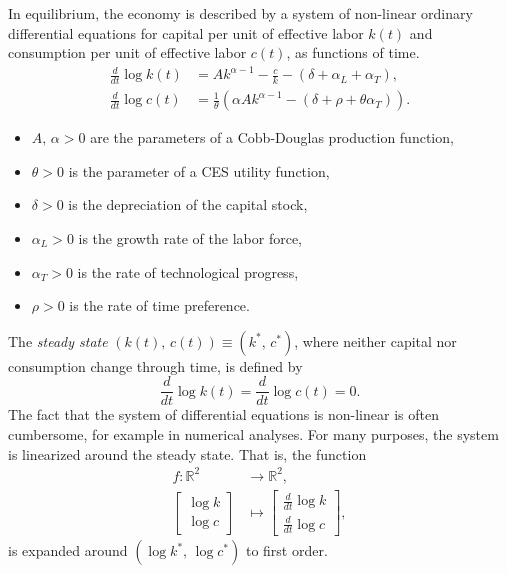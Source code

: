 \documentclass[10pt]{article}
\newcommand{\R}{\mathds{R}}
\begin{document}
In equilibrium, the economy is described by a system of non-linear ordinary differential equations for capital per unit of effective labor $k(t)$ and consumption per unit of effective labor $c(t)$, as functions of time.
\begin{align*}
\frac{d}{dt} \log k(t) &= A k^{\alpha-1} - \frac{c}{k} - (\delta + \alpha_L + \alpha_T),\\
\frac{d}{dt} \log c(t) &= \frac{1}{\theta} \left( \alpha A k^{\alpha-1} - (\delta + \rho + \theta \alpha_T) \right).
\end{align*}
\begin{itemize}
\item $A,\, \alpha>0$ are the parameters of a Cobb-Douglas production function, 
\item $\theta>0$ is the parameter of a CES utility function,
\item $\delta >0$ is the depreciation of the capital stock,
\item $\alpha_L>0$ is the growth rate of the labor force,
\item $\alpha_T>0$ is the rate of technological progress, 
\item $\rho>0$ is the rate of time preference.
\end{itemize}

The \textit{steady state} $(k(t),\, c(t)) \equiv (k^\ast,\, c^\ast)$, where neither capital nor consumption change through time, is defined by
\[
\frac{d}{dt} \log k(t) = \frac{d}{dt} \log c(t) = 0.
\]
The fact that the system of differential equations is non-linear is often cumbersome, for example in numerical analyses.  For many purposes, the system is linearized around the steady state.  That is, the function
\begin{align*}
f : \R^2 &\longrightarrow \R^2,\\
\left[ \begin{array}{c} \log k \\ \log c \end{array} \right] &\longmapsto \left[ \begin{array}{c} \frac{d}{dt} \log k \\ \frac{d}{dt} \log c \end{array} \right],
\end{align*}
is expanded around $(\log k^\ast,\, \log c^\ast)$ to first order. 
\end{document}
